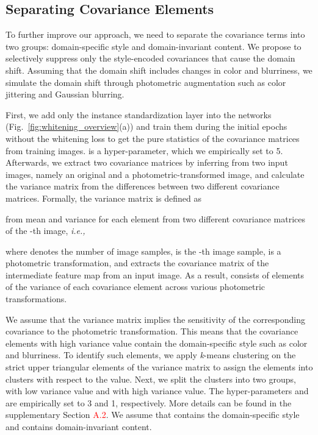\documentclass[final]{latex/cvpr}
\newcommand{\todow}[1]{\textcolor{red}{#1}}
\begin{document}
\subsection{Separating Covariance Elements}\label{method:deep_instance_selective_whitening}
\vspace*{-0.1cm}
To further improve our approach, we need to separate the covariance terms into two groups: domain-specific style and domain-invariant content. We propose to selectively suppress only the style-encoded covariances that cause the domain shift. Assuming that the domain shift includes changes in color and blurriness, we simulate the domain shift through photometric augmentation such as color jittering and Gaussian blurring.

First, we add only the instance standardization layer into the networks (Fig.~\ref{fig:whitening_overview}(a)) and train them during the  initial epochs
without the whitening loss to get the pure statistics of the covariance matrices from training images.  is a hyper-parameter, which we empirically set to 5. Afterwards, we extract two covariance matrices by inferring from two input images, namely an original and a photometric-transformed image, and calculate the variance matrix from the differences between two different covariance matrices. 
Formally, the variance matrix  is defined as
\vspace*{-0.1cm}

from mean  and variance  for each element from two different covariance matrices of the -th image, \textit{i.e.,}
\vspace*{-0.1cm}


where  denotes the number of image samples,  is the -th image sample,  is a photometric transformation, and  extracts the covariance matrix of the intermediate feature map from an input image.
As a result,  consists of elements of the variance of each covariance element across various photometric transformations.


We assume that the variance matrix  implies the sensitivity of the corresponding covariance to the photometric transformation. This means that the covariance elements with high variance value contain the domain-specific style such as color and blurriness.
To identify such elements, we apply \textit{k}-means clustering on the strict upper triangular elements  of the variance matrix  to assign the elements into  clusters  with respect to the value. 
Next, we split the  clusters into two groups,  with low variance value and  with high variance value.
The hyper-parameters  and  are empirically set to 3 and 1, respectively. More details can be found in the supplementary Section \todow{A.2}.
We assume that  contains the domain-specific style and  contains domain-invariant content.
\end{document}
